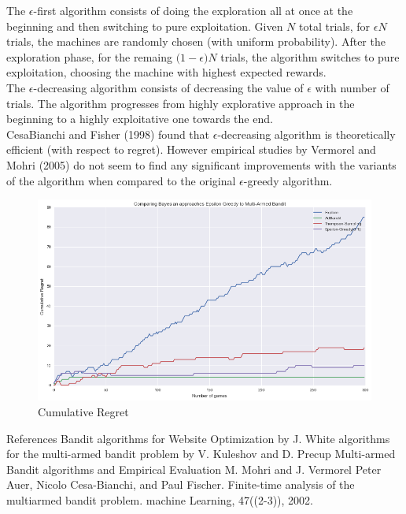 \documentclass{article}
\begin{document}
The $\epsilon$-first algorithm consists of doing the exploration all at once at the beginning and then switching to pure exploitation. Given $N$ total trials, for $\epsilon N$ trials, the machines are randomly chosen (with uniform probability). After the exploration phase, for the remaing $\big( 1-\epsilon \big) N$ trials, the algorithm switches to pure exploitation, choosing the machine with highest expected rewards.\\

The $\epsilon$-decreasing algorithm consists of decreasing the value of $\epsilon$ with number of trials. The algorithm progresses from highly explorative approach in the beginning to a highly exploitative one towards the end.\\

CesaBianchi and Fisher (1998) found that $\epsilon$-decreasing algorithm is theoretically efficient (with respect to regret). However empirical studies by Vermorel and Mohri (2005) do not seem to find any significant improvements with the variants of the algorithm when compared to the original $\epsilon$-greedy algorithm.\\

\begin{figure}[H]
\centering
\includegraphics[scale=0.4]{eps_greedy.png}
\caption{Cumulative Regret}
\end{figure}

References
Bandit algorithms for Website Optimization by J. White
algorithms for the multi-armed bandit problem by V. Kuleshov and D. Precup
Multi-armed Bandit algorithms and Empirical Evaluation M. Mohri and J. Vermorel
Peter Auer, Nicolo Cesa-Bianchi, and Paul Fischer. Finite-time analysis of the multiarmed bandit problem. machine Learning, 47((2-3)), 2002.
\end{document}
